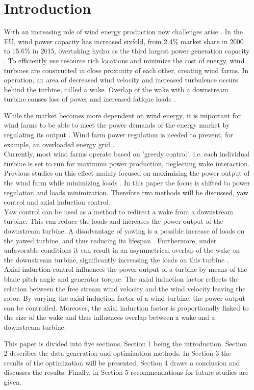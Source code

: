 \section{Introduction}
\lettrine[nindent=0em,lines=3]
With an increasing role of wind energy production new challenges arise \cite{Nat2016}. In the EU, wind power capacity has increased sixfold, from 2.4\% market share in 2000 to 15.6\% in 2015, overtaking hydro as the third largest power generation capacity \cite{EWEA2016}. To efficiently use resource rich locations and minimize the cost of energy, wind turbines are constructed in close proximity of each other, creating wind farms. In operation, an area of decreased wind velocity and increased turbulence occurs behind the turbine, called a wake. Overlap of the wake with a downstream turbine causes loss of power and increased fatique loads \cite{Boersma2017, Wilson2017, Dijk2016, Fleming2014, Zalkind2016}. 

While the market becomes more dependent on wind energy, it is important for wind farms to be able to meet the power demands of the energy market by regulating its output \cite{Tande2003}. Wind farm power regulation is needed to prevent, for example, an overloaded energy grid \cite{Hansen2014}.  \\
\indent Currently, most wind farms operate based on 'greedy control', i.e. each individual turbine is set to run for maximum power production, neglecting wake interaction. Previous studies on this effect mainly focused on maximizing the power output of the wind farm while minimizing loads \cite{Wilson2017, Dijk2016, vanDijk2016}. In this paper the focus is shifted to power regulation and loads minimization. Therefore two methods will be discussed, yaw control and axial induction control. \\
\indent Yaw control can be used as a method to redirect a wake from a downstream turbine. This can reduce the loads and increases the power output of the downstream turbine. A disadvantage of yawing is a possible increase of loads on the yawed turbine, and thus reducing its lifespan \cite{Zalkind2016,Kanev2017}. Furthermore, under unfavorable conditions it can result in an asymmetrical overlap of the wake on the downstream turbine, significantly increasing the loads on this turbine \cite{Wilson2017,Dijk2016}. \\
\indent Axial induction control influences the power output of a turbine by means of the blade pitch angle and generator torque. The axial induction factor reflects the relation between the free stream wind velocity and the wind velocity leaving the rotor. By varying the axial induction factor of a wind turbine, the power output can be controlled. Moreover, the axial induction factor is proportionally linked to the size of the wake and thus influences overlap between a wake and a downstream turbine.  

This paper is divided into five sections, Section 1 being the introduction. Section 2 describes the data generation and optimization methods. In Section 3 the results of the optimization will be presented. Section 4 draws a conclusion and discusses the results. Finally, in Section 5 recommendations for future studies are given.
